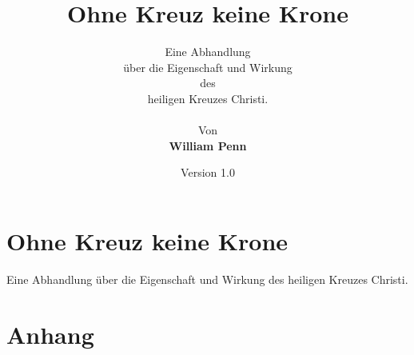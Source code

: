 \documentclass[a5paper,pagesize,10pt]{scrbook}
\begin{document}
\author{
Eine Abhandlung \\
über die Eigenschaft und Wirkung
\\
des
\\
heiligen Kreuzes Christi.
\\
\\
Von
\\
\textbf{William Penn}
}

\title{Ohne Kreuz keine Krone}
\date{Version 1.0}

\maketitle

\frontmatter

\tableofcontents




\mainmatter
\part{Ohne Kreuz keine Krone}
Eine Abhandlung über die Eigenschaft und Wirkung des
heiligen Kreuzes Christi.





















\backmatter
\part{Anhang}

\printindex
\end{document}
